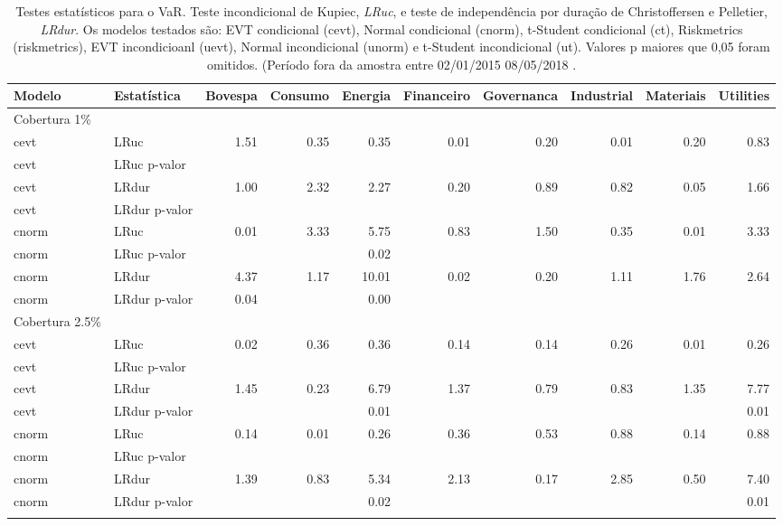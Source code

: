 \begin{longtable}{llrrrrrrrr}
\caption{Testes estatísticos para o VaR. Teste incondicional de Kupiec, \emph{LRuc}, e teste de
             independência por duração de Christoffersen e Pelletier, \emph{LRdur}. Os modelos testados
são: EVT condicional (cevt), Normal condicional (cnorm), t-Student condicional (ct), Riskmetrics 
(riskmetrics), EVT incondicioanl (uevt), Normal incondicional (unorm) e t-Student incondicional (ut).
Valores p maiores que 0,05 foram omitidos. (Período fora da amostra entre 02/01/2015 08/05/2018 .} \\ 
  \toprule
Modelo & Estatística & Bovespa & Consumo & Energia & Financeiro & Governanca & Industrial & Materiais & Utilities \\ 
  \midrule
Cobertura 1\% &  &  &  &  &  &  &  &  &  \\ 
  cevt & LRuc & 1.51 & 0.35 & 0.35 & 0.01 & 0.20 & 0.01 & 0.20 & 0.83 \\ 
  cevt & LRuc p-valor &  &  &  &  &  &  &  &  \\ 
  cevt & LRdur & 1.00 & 2.32 & 2.27 & 0.20 & 0.89 & 0.82 & 0.05 & 1.66 \\ 
  cevt & LRdur p-valor &  &  &  &  &  &  &  &  \\ 
  cnorm & LRuc & 0.01 & 3.33 & 5.75 & 0.83 & 1.50 & 0.35 & 0.01 & 3.33 \\ 
  cnorm & LRuc p-valor &  &  & 0.02 &  &  &  &  &  \\ 
  cnorm & LRdur & 4.37 & 1.17 & 10.01 & 0.02 & 0.20 & 1.11 & 1.76 & 2.64 \\ 
  cnorm & LRdur p-valor & 0.04 &  & 0.00 &  &  &  &  &  \\ 
  Cobertura 2.5\% &  &  &  &  &  &  &  &  &  \\ 
  cevt & LRuc & 0.02 & 0.36 & 0.36 & 0.14 & 0.14 & 0.26 & 0.01 & 0.26 \\ 
  cevt & LRuc p-valor &  &  &  &  &  &  &  &  \\ 
  cevt & LRdur & 1.45 & 0.23 & 6.79 & 1.37 & 0.79 & 0.83 & 1.35 & 7.77 \\ 
  cevt & LRdur p-valor &  &  & 0.01 &  &  &  &  & 0.01 \\ 
  cnorm & LRuc & 0.14 & 0.01 & 0.26 & 0.36 & 0.53 & 0.88 & 0.14 & 0.88 \\ 
  cnorm & LRuc p-valor &  &  &  &  &  &  &  &  \\ 
  cnorm & LRdur & 1.39 & 0.83 & 5.34 & 2.13 & 0.17 & 2.85 & 0.50 & 7.40 \\ 
  cnorm & LRdur p-valor &  &  & 0.02 &  &  &  &  & 0.01 \\ 
   \bottomrule
\label{tab:vartest}
\end{longtable}

